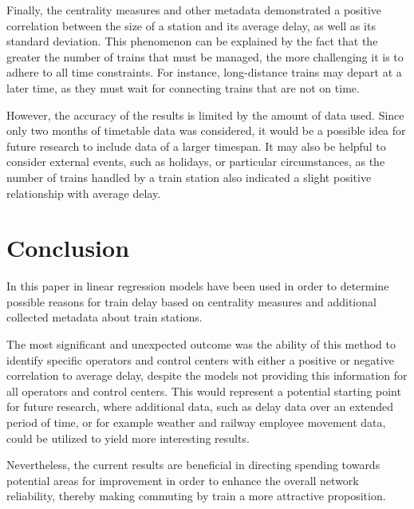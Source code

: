 \documentclass[12pt,a4paper]{article}
\begin{document}
Finally, the centrality measures and other metadata demonstrated a positive correlation between the size of a station and its average delay, as well as its standard deviation. 
This phenomenon can be explained by the fact that the greater the number of trains that must be managed, the more challenging it is to adhere to all time constraints. 
For instance, long-distance trains may depart at a later time, as they must wait for connecting trains that are not on time.

However, the accuracy of the results is limited by the amount of data used. Since only two months of timetable data was considered, it would be a possible idea for future research to include data of a larger timespan. 
It may also be helpful to consider external events, such as holidays, or particular circumstances, as the number of trains handled by a train station also indicated a slight positive relationship with average delay.

\maketitle
\section{\label{sec:Conclusion}Conclusion}

In this paper in linear regression models have been used in order to determine possible reasons for train delay based on centrality measures and additional collected metadata about train stations. 

The most significant and unexpected outcome was the ability of this method to identify specific operators and control centers with either a positive or negative correlation to average delay, despite the models not providing this information for all operators and control centers. 
This would represent a potential starting point for future research, where additional data, such as delay data over an extended period of time, or for example weather and railway employee movement data, could be utilized to yield more interesting results. 

Nevertheless, the current results are beneficial in directing spending towards potential areas for improvement in order to enhance the overall network reliability, thereby making commuting by train a more attractive proposition.
\pagebreak
\listoffigures
\listoftables
\printbibliography
\end{document}
